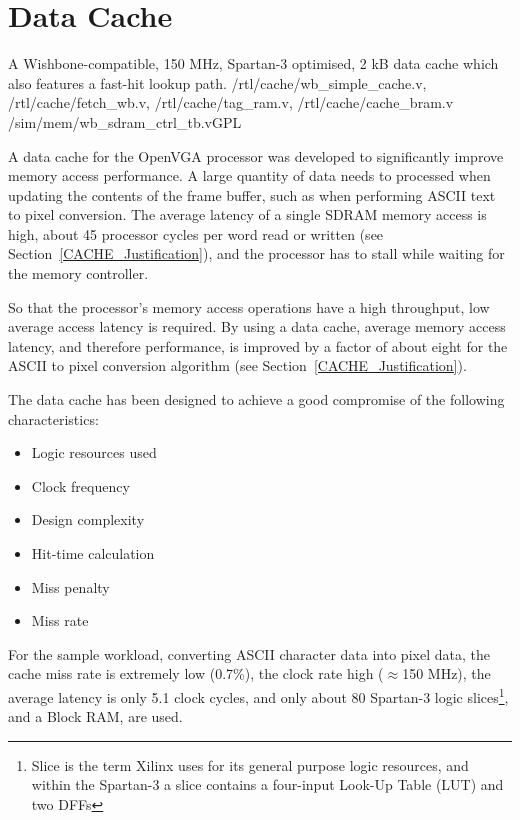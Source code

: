 \section{Data Cache}
\label{MEM_Cache}

{A Wishbone-compatible, 150 MHz, Spartan-3 optimised, 2 kB data cache which also
features a fast-hit lookup path.} {/rtl/cache/wb\_simple\_cache.v,
/rtl/cache/fetch\_wb.v, /rtl/cache/tag\_ram.v, /rtl/cache/cache\_bram.v}
{/sim/mem/wb\_sdram\_ctrl\_tb.v}{GPL}

A data cache for the OpenVGA processor was developed to significantly improve
memory access performance. A large quantity of data needs to processed when
updating the contents of the frame buffer, such as when performing ASCII text to
pixel conversion. The average latency of a single SDRAM memory access is high,
about 45 processor cycles per word read or written (see
Section~\ref{CACHE_Justification}), and the processor has to stall while waiting
for the memory controller.

So that the processor's memory access operations have a high throughput, low
average access latency is required. By using a data cache, average memory access
latency, and therefore performance, is improved by a factor of about eight for
the ASCII to pixel conversion algorithm (see Section~\ref{CACHE_Justification}).

The data cache has been designed to achieve a good compromise of the following
characteristics:
\begin{itemize}
  \item Logic resources used
  \item Clock frequency
  \item Design complexity
  \item Hit-time calculation
  \item Miss penalty
  \item Miss rate
\end{itemize}

For the sample workload, converting ASCII character data into pixel data, the
cache miss rate is extremely low (0.7\%), the clock rate high ($\approx$150
MHz), the average latency is only 5.1 clock cycles, and only about 80 Spartan-3
logic slices\footnote{Slice is the term Xilinx uses for its general purpose logic
resources, and within the Spartan-3 a slice contains a four-input Look-Up
Table (LUT) and two DFFs}, and
a Block RAM, are used.


